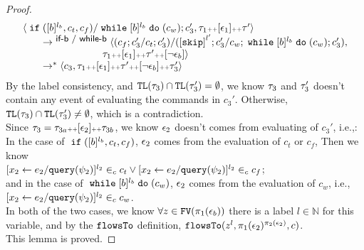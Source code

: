 \begin{proof}
\begin{equation}
\begin{array}{l}
    \config{\eif ([b]^{l_b}, c_t, c_f) / \ewhile [b]^{l_b} \edo (c_w);{c}_3', 
    \vtrace_1 \tracecat [\event_1] \tracecat \trace'} 
    \\
    \qquad 
     \rightarrow^{\rname{if-b / while-b}} 
    \config{(c_f;c_3' / c_t;c_3') /(\clabel{\eskip}^{l'}; c_3' / c_w; \ewhile [b]^{l_b} \edo (c_w);{c}_3' ), 
	\\ \qquad \qquad \qquad \qquad
	\trace_1 \tracecat [\event_1]  \tracecat \trace' \tracecat [\neg \event_b]} 
    \\
    \qquad   \rightarrow^{*} 
    \config{c_3, 
    \trace_1 \tracecat [\event_1]  \tracecat \trace' \tracecat [\neg \event_b] \tracecat  \trace_3'}
  \end{array}
\end{equation}
%
By the label consistency, and $\mathtt{TL}({\mathtt{\tau}_3}) \cap \mathtt{TL}({\mathtt{\tau}_3'}) = \emptyset$, 
we know $\mathtt{\tau}_3$ and $\mathtt{\tau}_3'$ doesn't contain any event of evaluating the commands in $c_3'$.
Otherwise, $\mathtt{TL}({\mathtt{\tau}_3}) \cap \mathtt{TL}({\mathtt{\tau}_3'}) \neq \emptyset$, which is a contradiction.
\\
Since $\mathtt{\tau}_3= \mathtt{\tau}_{3a} {\scriptscriptstyle ++} [\mathtt{\epsilon}_2] {\scriptscriptstyle ++} \mathtt{\tau}_{3b} $, we know $\mathtt{\epsilon}_2$ doesn't comes from evaluating
of $c_3'$, i.e.,:
\\
In the case of $\;\mathtt{if}\; ([b]^{l_b}, c_t, c_f)$, $\mathtt{\epsilon}_2$ comes from the evaluation of $c_t$ or $c_f$,
Then we know
\\
 $[\mathrel{ {x}_2 \leftarrow e_2 / {\tt query}(\psi_2) }]^{l_2} \in_c c_t 
 \lor [\mathrel{ {x}_2 \leftarrow e_2 / {\tt query}(\psi_2) }]^{l_2} \in_c c_f$;
\\
and in the case of $\;\mathtt{while}\; [b]^{l_b} \;\mathtt{do}\; (c_w)$, $\mathtt{\epsilon}_2$ comes from the evaluation of $c_w$,
i.e., $[\mathrel{ {x}_2 \leftarrow e_2 / {\tt query}(\psi_2) }]^{l_2} \in_c c_w$.
\\
In both of the two cases, we know $\forall z \in \mathtt{FV}(\pi_1(\mathtt{\epsilon}_b)) $ there is a label $l \in \mathbb{N}$ for this variable,
and by the $\mathtt{flowsTo}$ definition, 
$\mathtt{flowsTo}(z^l, \pi_1(\mathtt{\epsilon}_2)^{\pi_2(\mathtt{\epsilon}_2)},c)$.
\\
This lemma is proved.
	\end{proof}
%